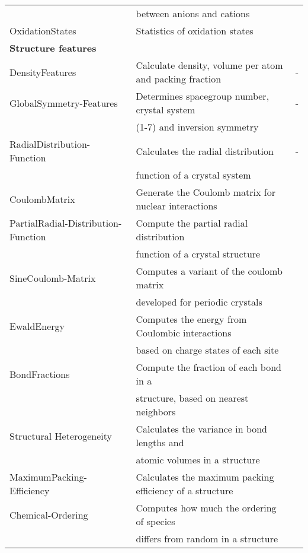 \begin{center}
\begin{longtable}{M{4.0cm} M{7.5cm} M{2.0cm}}
   &  between anions and cations & \\ 
  OxidationStates & Statistics of oxidation states & \cite{Deml2016}  \\   
\hline 
  \textbf{Structure features} & & \\   
  DensityFeatures & Calculate density, volume per atom and packing fraction & - \\   
  GlobalSymmetry-Features & Determines spacegroup number, crystal system  & - \\   
   & (1-7) and inversion symmetry & \\ 
  RadialDistribution-Function & Calculates the radial distribution  & - \\   
   & function of a crystal system & \\ 
  CoulombMatrix & Generate the Coulomb matrix for nuclear interactions  & \cite{Rupp2012}  \\    
  PartialRadial-Distribution-Function & Compute the partial radial distribution  & \cite{Schuett2014}  \\   
   & function of a crystal structure & \\ 
  SineCoulomb-Matrix & Computes a variant of the coulomb matrix & \cite{Faber2015}  \\   
   & developed for periodic crystals & \\ 
  EwaldEnergy & Computes the energy from Coulombic interactions  & \cite{Ewald1921}  \\   
   & based on charge states of each site & \\ 
  BondFractions & Compute the fraction of each bond in a  & \cite{Hansen2015}  \\   
   & structure, based on nearest neighbors & \\ 
  Structural Heterogeneity & Calculates the variance in bond lengths and  & \cite{Ward2017}  \\   
   & atomic volumes in a structure & \\ 
  MaximumPacking-Efficiency & Calculates the maximum packing efficiency of a structure & \cite{Ward2017} \\   
  Chemical-Ordering & Computes how much the ordering of species  & \cite{Ward2017}  \\   
   & differs from random in a structure & \\ 

\end{longtable}
\end{center}
